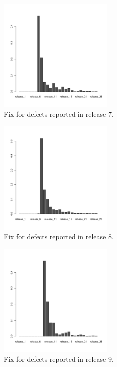 \begin{figure}[thb!]
      \caption{Fix for defects reported in release 7.}
      \label{fig:defect_release_7}
      \includegraphics[width=0.49\textwidth]{figures/r7}
\end{figure}

\begin{figure}[thb!]
      \caption{Fix for defects reported in release 8.}
      \label{fig:defect_release_8}
      \includegraphics[width=0.49\textwidth]{figures/r8}
\end{figure}

\begin{figure}[thb!]
      \caption{Fix for defects reported in release 9.}
      \label{fig:defect_release_9}
      \includegraphics[width=0.49\textwidth]{figures/r9}
\end{figure}

